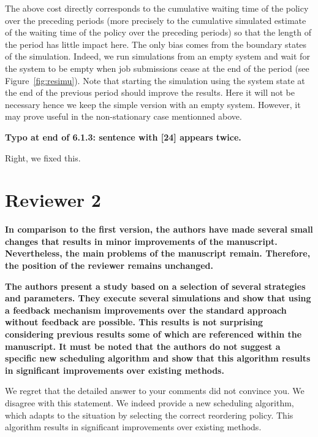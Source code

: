 \documentclass[]{article}
\begin{document}
\begin{displayquote}
The above cost directly corresponds to the cumulative waiting time of the
policy over the preceding periods (more precisely to the cumulative simulated
estimate of the waiting time of the policy over the preceding periods) so that
the length of the period has little impact here. The only bias comes from the
boundary states of the simulation. Indeed, we run simulations from an empty
system and wait for the system to be empty when job submissions cease at the
end of the period (see Figure~\ref{fig:resimu}). Note that starting the simulation
using the system state at the end of the previous period should improve the results.
Here it will not be necessary hence we keep the simple version with an empty system.
However, it may prove useful in the non-stationary case mentionned above.
\end{displayquote}

\medskip


\textbf{Typo at end of 6.1.3: sentence with [24] appears twice.
}

Right, we fixed this.

\medskip


\section{Reviewer 2}

\textbf{In comparison to the first version, the authors have made several small changes that results in minor improvements of
the manuscript. Nevertheless, the main problems of the manuscript remain. Therefore, the position of the reviewer
remains unchanged.
}

\textbf{The authors present a study based on a selection of several strategies and parameters. They execute several simulations
and show that using a feedback mechanism improvements over the standard approach without feedback are possible. This
results is not surprising considering previous results some of which are referenced within the manuscript. It must be
noted that the authors do not suggest a specific new scheduling algorithm and show that this algorithm results in
significant improvements over existing methods.
}

We regret that the detailed answer to your comments did not convince you. We disagree with this statement. We indeed
provide a new scheduling algorithm, which adapts to the situation by selecting the correct reordering policy. This algorithm
results in significant improvements over existing methods.
\end{document}
